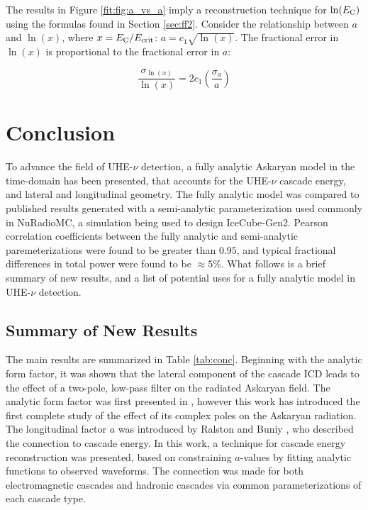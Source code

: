 \documentclass[amsmath,amssymb,aps,prd,10pt,twocolumn]{revtex4}
\begin{document}
The results in Figure \ref{fit:fig:a_vs_a} imply a reconstruction technique for $\ln(E_{\rm C})$ using the formulas found in Section \ref{sec:ff2}.  Consider the relationship between $a$ and $\ln(x)$, where $x = E_{\rm C}/E_{\rm crit}$: $a = c_1 \sqrt{\ln(x)}$.  The fractional error in $\ln(x)$ is proportional to the fractional error in $a$:

\begin{equation}
\frac{\sigma_{\ln(x)}}{\ln(x)} = 2 c_1 \left( \frac{\sigma_a}{a}\right) \label{eq:energy}
\end{equation}

\section{Conclusion}
\label{sec:conc}

To advance the field of UHE-$\nu$ detection, a fully analytic Askaryan model in the time-domain has been presented, that accounts for the UHE-$\nu$ cascade energy, and lateral and longitudinal geometry.  The fully analytic model was compared to published results generated with a semi-analytic parameterization used commonly in NuRadioMC, a simulation being used to design IceCube-Gen2.  Pearson correlation coefficients between the fully analytic and semi-analytic paremeterizations were found to be greater than $0.95$, and typical fractional differences in total power were found to be $\approx 5$\%.  What follows is a brief summary of new results, and a list of potential uses for a fully analytic model in UHE-$\nu$ detection.

\subsection{Summary of New Results}

The main results are summarized in Table \ref{tab:conc}.  Beginning with the analytic form factor, it was shown that the lateral component of the cascade ICD leads to the effect of a two-pole, low-pass filter on the radiated Askaryan field.  The analytic form factor was first presented in \cite{10.1016/j.astropartphys.2017.03.008}, however this work has introduced the first complete study of the effect of its complex poles on the Askaryan radiation.  The longitudinal factor $a$ was introduced by Ralston and Buniy \cite{10.1103/physrevd.65.016003}, who described the connection to cascade energy.  In this work, a technique for cascade energy reconstruction was presented, based on constraining $a$-values by fitting analytic functions to observed waveforms.  The connection was made for both electromagnetic cascades and hadronic cascades via common parameterizations of each cascade type.
\end{document}
